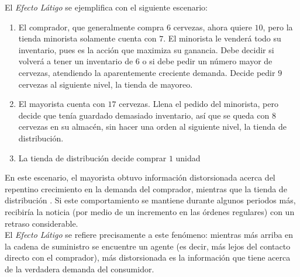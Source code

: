 El \textit{Efecto Látigo} se ejemplifica con el siguiente escenario:


\begin{enumerate}
    \item El comprador, que generalmente compra $6$ cervezas, ahora quiere $10$, pero la tienda minorista solamente cuenta con $7$. El minorista le venderá todo su inventario, pues es la acci\'on que maximiza su ganancia. Debe decidir si volverá a tener un inventario de $6$ o si debe pedir un número mayor de cervezas, atendiendo la aparentemente creciente demanda. Decide pedir $9$ cervezas al siguiente nivel, la tienda de mayoreo.
    \item El mayorista cuenta con $17$ cervezas. Llena el pedido del minorista, pero decide que ten\'ia guardado demasiado inventario, as\'i que se queda con $8$ cervezas en su almac\'en, sin hacer una orden al siguiente nivel, la tienda de distribución.
    \item La tienda de distribuci\'on decide comprar $1$ unidad
\end{enumerate}

En este escenario, el mayorista obtuvo informaci\'on distorsionada acerca del repentino crecimiento en la demanda del comprador, mientras que la tienda de distribución . Si este comportamiento se mantiene durante algunos periodos más, recibiría la noticia (por medio de un incremento en las órdenes regulares) con un retraso considerable.\\

El \textit{Efecto Látigo} se refiere precisamente a este fenómeno: mientras más arriba en la cadena de suministro se encuentre un agente (es decir, más lejos del contacto directo con el comprador), más distorsionada es la información que tiene acerca de la verdadera demanda del consumidor.